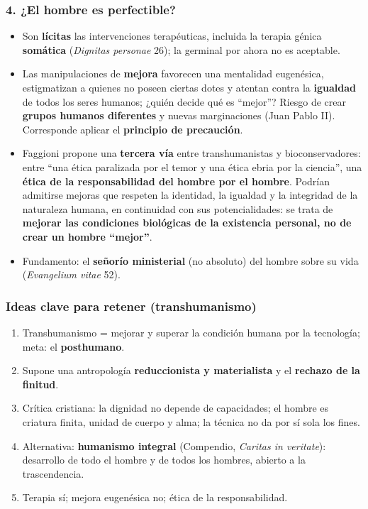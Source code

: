 \documentclass[10pt,a4paper]{article}
\begin{document}
\subsubsection{4. ¿El hombre es perfectible?}
\begin{itemize}
\item Son \textbf{lícitas} las intervenciones terapéuticas, incluida la terapia génica \textbf{somática} (\textit{Dignitas personae} 26); la germinal por ahora no es aceptable.
\item Las manipulaciones de \textbf{mejora} favorecen una mentalidad eugenésica, estigmatizan a quienes no poseen ciertas dotes y atentan contra la \textbf{igualdad} de todos los seres humanos; ¿quién decide qué es ``mejor''? Riesgo de crear \textbf{grupos humanos diferentes} y nuevas marginaciones (Juan Pablo II). Corresponde aplicar el \textbf{principio de precaución}.
\item Faggioni propone una \textbf{tercera vía} entre transhumanistas y bioconservadores: entre ``una ética paralizada por el temor y una ética ebria por la ciencia'', una \textbf{ética de la responsabilidad del hombre por el hombre}. Podrían admitirse mejoras que respeten la identidad, la igualdad y la integridad de la naturaleza humana, en continuidad con sus potencialidades: se trata de \textbf{mejorar las condiciones biológicas de la existencia personal, no de crear un hombre ``mejor''}.
\item Fundamento: el \textbf{señorío ministerial} (no absoluto) del hombre sobre su vida (\textit{Evangelium vitae} 52).
\end{itemize}

\subsubsection{Ideas clave para retener (transhumanismo)}
\begin{enumerate}
\item Transhumanismo = mejorar y superar la condición humana por la tecnología; meta: el \textbf{posthumano}.
\item Supone una antropología \textbf{reduccionista y materialista} y el \textbf{rechazo de la finitud}.
\item Crítica cristiana: la dignidad no depende de capacidades; el hombre es criatura finita, unidad de cuerpo y alma; la técnica no da por sí sola los fines.
\item Alternativa: \textbf{humanismo integral} (Compendio, \textit{Caritas in veritate}): desarrollo de todo el hombre y de todos los hombres, abierto a la trascendencia.
\item Terapia sí; mejora eugenésica no; ética de la responsabilidad.
\end{enumerate}
\end{document}
